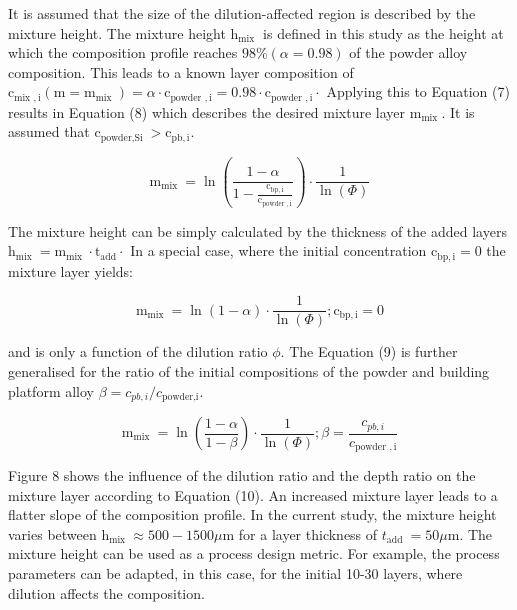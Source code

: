 \documentclass[10pt]{article}
\begin{document}
It is assumed that the size of the dilution-affected region is described by the mixture height. The mixture height $\mathrm{h}_{\text {mix }}$ is defined in this study as the height at which the composition profile reaches $98 \%(\alpha=0.98)$ of the powder alloy composition. This leads to a known layer composition of $\mathrm{c}_{\text {mix }, \mathrm{i}}\left(\mathrm{m}=\mathrm{m}_{\text {mix }}\right)=\alpha \cdot \mathrm{c}_{\text {powder }, \mathrm{i}}=0.98 \cdot \mathrm{c}_{\text {powder }, \mathrm{i}} \cdot$ Applying this to Equation (7) results in Equation (8) which describes the desired mixture layer $\mathrm{m}_{\text {mix }}$. It is assumed that $\mathrm{c}_{\text {powder,Si }}>\mathrm{c}_{\mathrm{pb}, \mathrm{i}}$.


\begin{equation*}
\mathrm{m}_{\text {mix }}=\ln \left(\frac{1-\alpha}{1-\frac{\mathrm{c}_{\mathrm{bp}, \mathrm{i}}}{\mathrm{c}_{\text {powder }, \mathrm{i}}}}\right) \cdot \frac{1}{\ln (\Phi)} \tag{8}
\end{equation*}


The mixture height can be simply calculated by the thickness of the added layers $\mathrm{h}_{\text {mix }}=\mathrm{m}_{\text {mix }} \cdot \mathrm{t}_{\mathrm{add}} \cdot$ In a special case, where the initial concentration $\mathrm{c}_{\mathrm{bp}, \mathrm{i}}=0$ the mixture layer yields:


\begin{equation*}
\mathrm{m}_{\text {mix }}=\ln (1-\alpha) \cdot \frac{1}{\ln (\Phi)} ; \mathrm{c}_{\mathrm{bp}, \mathrm{i}}=0 \tag{9}
\end{equation*}


and is only a function of the dilution ratio $\phi$. The Equation (9) is further generalised for the ratio of the initial compositions of the powder and building platform alloy $\beta=c_{p b, i} / c_{\text {powder,i}}$.


\begin{equation*}
\mathrm{m}_{\text {mix }}=\ln \left(\frac{1-\alpha}{1-\beta}\right) \cdot \frac{1}{\ln (\Phi)} ; \beta=\frac{c_{p b, i}}{c_{\text {powder }, \mathrm{i}}} \tag{10}
\end{equation*}


Figure 8 shows the influence of the dilution ratio and the depth ratio on the mixture layer according to Equation (10). An increased mixture layer leads to a flatter slope of the composition profile. In the current study, the mixture height varies between $\mathrm{h}_{\text {mix }} \approx 500-1500 \mu \mathrm{m}$ for a layer thickness of $t_{\text {add }}=50 \mu \mathrm{m}$. The mixture height can be used as a process design metric. For example, the process parameters can be adapted, in this case, for the initial 10-30 layers, where dilution affects the composition.
\end{document}
